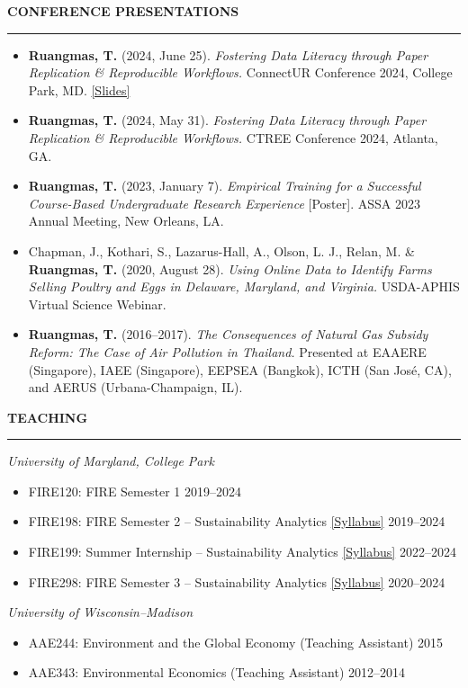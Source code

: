 \documentclass[11pt,letterpaper]{article}
\renewcommand{\section}[1]{%
  \par\vspace{10pt}%
  {\large\bfseries\color{accent}#1}\par\vspace{-3pt}%
  {\color{accent}\rule{\linewidth}{0.6pt}}\par\vspace{4pt}}
\newcommand{\pubentry}[1]{\item #1}
\begin{document}
\section{CONFERENCE PRESENTATIONS}
\begin{itemize}
  \pubentry{\textbf{Ruangmas, T.} (2024, June 25). \textit{Fostering Data Literacy through Paper Replication \& Reproducible Workflows.} ConnectUR Conference 2024, College Park, MD. \href{https://drive.google.com/file/d/1sWazDSKhvuPo2vBjK3psZ5JWO0LkyMRQ/view?usp=drive_link}{[Slides]}}
  \pubentry{\textbf{Ruangmas, T.} (2024, May 31). \textit{Fostering Data Literacy through Paper Replication \& Reproducible Workflows.} CTREE Conference 2024, Atlanta, GA.}
  \pubentry{\textbf{Ruangmas, T.} (2023, January 7). \textit{Empirical Training for a Successful Course-Based Undergraduate Research Experience} [Poster]. ASSA 2023 Annual Meeting, New Orleans, LA.}
  \pubentry{Chapman, J., Kothari, S., Lazarus-Hall, A., Olson, L. J., Relan, M. \& \textbf{Ruangmas, T.} (2020, August 28). \textit{Using Online Data to Identify Farms Selling Poultry and Eggs in Delaware, Maryland, and Virginia.} USDA-APHIS Virtual Science Webinar.}
\pubentry{\textbf{Ruangmas, T.} (2016--2017). \textit{The Consequences of Natural Gas Subsidy Reform: The Case of Air Pollution in Thailand.} Presented at EAAERE (Singapore), IAEE (Singapore), EEPSEA (Bangkok), ICTH (San Jos\'e, CA), and AERUS (Urbana-Champaign, IL).}
\end{itemize}

\section{TEACHING}
\textit{University of Maryland, College Park}
\begin{itemize}
  \item FIRE120: FIRE Semester 1 \hfill 2019--2024
  \item FIRE198: FIRE Semester 2 -- Sustainability Analytics \href{https://github.com/ruangmas/ruangmas.github.io/blob/main/documents/FIRE198.pdf}{[Syllabus]} \hfill 2019--2024
  \item FIRE199: Summer Internship -- Sustainability Analytics \href{https://github.com/ruangmas/ruangmas.github.io/blob/main/documents/FIRE199.pdf}{[Syllabus]} \hfill 2022--2024
  \item FIRE298: FIRE Semester 3 -- Sustainability Analytics \href{https://github.com/ruangmas/ruangmas.github.io/blob/main/documents/FIRE298.pdf}{[Syllabus]} \hfill 2020--2024
\end{itemize}
\vspace{4pt}
\textit{University of Wisconsin--Madison}
\begin{itemize}
  \item AAE244: Environment and the Global Economy (Teaching Assistant) \hfill 2015
  \item AAE343: Environmental Economics (Teaching Assistant) \hfill 2012--2014
\end{itemize}
\end{document}
